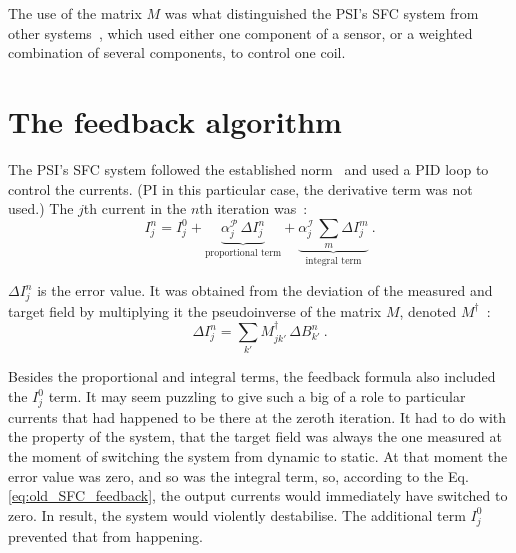 The use of the matrix $M$ was what distinguished the PSI's SFC system from other systems~\cite{Kelha1982,Brake1991,Spemann2003,Brys2005,Kobayashi2012,Voigt2013}, which used either one component of a sensor, or a weighted combination of several components, to control one coil.



\section{The feedback algorithm}
The PSI's SFC system followed the established norm~\cite{Kelha1982,Brake1991,Spemann2003,Brys2005} and used a PID loop to control the currents. (PI in this particular case, the derivative term was not used.) The $j$th current in the $n$th iteration was~\cite{Franke2013}:
\begin{equation}
  \label{eq:old_SFC_feedback}
  I^n_j = I^0_j +
    \underbrace{ \alpha^\mathcal{P}_j \, \Delta I^n_j }_\text{proportional term} +
    \underbrace{ \alpha^\mathcal{I}_j \, \sum_m \Delta I^m_j }_\text{integral term} \ .
\end{equation}

$\Delta I^n_j$ is the error value. It was obtained from the deviation of the measured and target field by multiplying it the pseudoinverse of the matrix $M$, denoted $M^\dagger$~\cite{Franke2013}:
\begin{equation}
  \Delta I^n_j = \sum_{k'} M^\dagger_{jk'} \, \Delta B^n_{k'} \ .
\end{equation}

Besides the proportional and integral terms, the feedback formula also included the $I^0_j$ term. It may seem puzzling to give such a big of a role to particular currents that had happened to be there at the zeroth iteration. It had to do with the property of the system, that the target field was always the one measured at the moment of switching the system from dynamic to static.
At that moment the error value was zero, and so was the integral term, so, according to the Eq.\,\ref{eq:old_SFC_feedback}, the output currents would immediately have switched to zero. In result, the system would violently destabilise. The additional term $I^0_j$ prevented that from happening.


